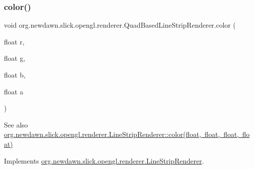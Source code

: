 \subsubsection{\texorpdfstring{color()}{color()}}
{\footnotesize\ttfamily void org.\+newdawn.\+slick.\+opengl.\+renderer.\+Quad\+Based\+Line\+Strip\+Renderer.\+color (\begin{DoxyParamCaption}\item[{float}]{r,  }\item[{float}]{g,  }\item[{float}]{b,  }\item[{float}]{a }\end{DoxyParamCaption})\hspace{0.3cm}{\ttfamily [inline]}}

\begin{DoxySeeAlso}{See also}
\mbox{\hyperlink{interfaceorg_1_1newdawn_1_1slick_1_1opengl_1_1renderer_1_1_line_strip_renderer_ac54eda776408b41d1e5ccaa988267162}{org.\+newdawn.\+slick.\+opengl.\+renderer.\+Line\+Strip\+Renderer\+::color(float, float, float, float)}} 
\end{DoxySeeAlso}


Implements \mbox{\hyperlink{interfaceorg_1_1newdawn_1_1slick_1_1opengl_1_1renderer_1_1_line_strip_renderer_ac54eda776408b41d1e5ccaa988267162}{org.\+newdawn.\+slick.\+opengl.\+renderer.\+Line\+Strip\+Renderer}}.


